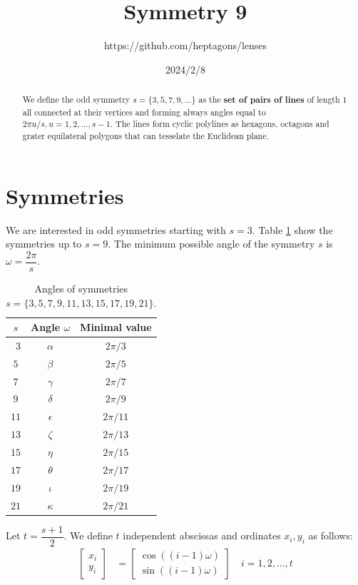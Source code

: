 \documentclass[11pt]{article}
\title{Symmetry 9}
\author{https://github.com/heptagons/lenses}
\date{2024/2/8}
\begin{document}
\maketitle
\begin{abstract}
We define the odd symmetry $s=\{ 3,5,7,9,... \}$ as the \textbf{set of pairs of lines} of length $1$ all connected at their vertices and forming always angles equal to $2\pi u/s, u = 1,2,...,s-1$. The lines form cyclic polylines as hexagons, octagons and grater equilateral polygons that can tesselate the Euclidean plane.
\end{abstract}

\section{Symmetries}

We are interested in odd symmetries starting with $s=3$. Table \ref{tbl:symm} show the symmetries up to $s=9$. The minimum possible angle of the symmetry $s$ is $\omega = \dfrac{2\pi}s$. 

\begin{table}[H]
\begin{center}
\begin{tabular}{|c|c c|}
\hline
$s$ & Angle $\omega$ & Minimal value \\ \hline\
$3$ & $\alpha$ & $2\pi/3$ \\ \hline
$5$ & $\beta$  & $2\pi/5$ \\ \hline
$7$ & $\gamma$ & $2\pi/7$ \\ \hline
$9$ & $\delta$ & $2\pi/9$ \\ \hline
$11$ & $\epsilon$ & $2\pi/11$ \\ \hline
$13$ & $\zeta$ & $2\pi/13$ \\ \hline
$15$ & $\eta$ & $2\pi/15$ \\ \hline
$17$ & $\theta$ & $2\pi/17$ \\ \hline
$19$ & $\iota$ & $2\pi/19$ \\ \hline
$21$ & $\kappa$ & $2\pi/21$ \\ \hline
\end{tabular}
\caption{Angles of symmetries $s=\{3,5,7,9,11,13,15,17,19,21\}$.} 
\label{tbl:symm}
\end{center}
\end{table}

Let $t = \dfrac{s+1}2$. We define $t$ independent abscissas and ordinates $x_i, y_i$ as follows:
\begin{align}
\left[ \begin{array}{c} x_i \\ y_i \end{array} \right] &= 
\left[ \begin{array}{c} \cos((i-1)\omega) \\ \sin((i-1)\omega) \end{array} \right]
 \quad i = 1,2,...,t \label{eq:pairs}
\end{align}
\end{document}
